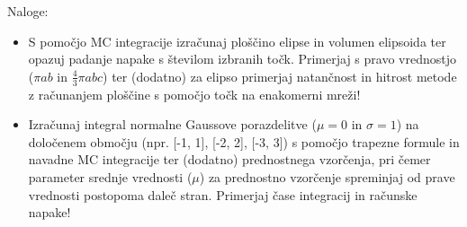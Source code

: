\documentclass[12pt]{article}
\begin{document}
Naloge:\\
\begin{itemize}
\item S pomočjo MC integracije izračunaj ploščino elipse in
  volumen elipsoida ter opazuj padanje napake s številom izbranih točk. 
  Primerjaj s pravo vrednostjo ($\pi a b$ in $\frac{4}{3} \pi a b c$) ter (dodatno) za elipso primerjaj natančnost in hitrost metode 
  z računanjem ploščine s pomočjo točk na enakomerni mreži!
\item Izračunaj integral normalne Gaussove porazdelitve ($\mu = 0$ in $\sigma = 1$) na določenem območju (npr. [-1, 1], [-2, 2], [-3, 3]) s pomočjo
  trapezne formule in navadne MC integracije ter (dodatno) prednostnega 
  vzorčenja, pri čemer parameter srednje vrednosti ($\mu$) za prednostno vzorčenje
  spreminjaj od prave vrednosti postopoma daleč stran. Primerjaj čase integracij in računske napake!
\end{itemize}

\clearpage
\end{document}
